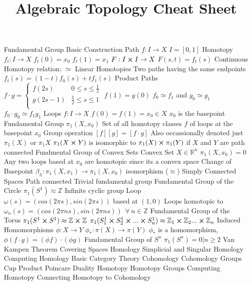 \documentclass[14pt]{extarticle}
\title{Algebraic Topology Cheat Sheet}
\begin{document}
	\maketitle
	

	\begin{outline}		
		\1	Fundamental Group
			\2	Basic Construction	
				\3	Path
					\4	$f : I \rightarrow X$
					\4	$I = [0,1]$
				\3	Homotopy
					\4	$f_t : I \rightarrow X$
					\4	$f_t(0) = x_0$
					\4	$f_t(1) = x_1$
					\4	$F: I \cross I \rightarrow X$
					\4	$F(s,t) = f_t(s)$ Continuous
					\4	Homotopy relation: $\simeq$
				\3	Linear Homotopies
					\4	Two paths having the same endpoints
					\4	$f_t(s) = (1-t)f_0(s) + tf_1(s)$
				\3	Product Paths
					\4	$f \cdot g = \begin{cases}
														f(2s) & 0 \le s \le \frac{1}{2}	\\
														g(2s-1) & \frac{1}{2} \le s \le 1 \\
														\end{cases}
													$
					\4	$f(1) = g(0)$
					\4	$f_0 \simeq f_1$ and $g_0 \simeq g_1$
					\4	$f_0 \cdot g_0 \simeq f_1 g_1$
				\3	Loops
					\4	$f : I \rightarrow X$
					\4	$f(0) = f(1) = x_0 \in X$
					\4	$x_0$ is the basepoint
				\3	Fundamental Group $\pi_1(X,x_0)$
					\4	Set of all homotopy classes $f$ of loops at the basepoint $x_0$
					\4	Group operation $[f][g] = [f \cdot g]$
					\4	Also occassionally denoted just $\pi_1(X)$ or $\pi_1X$
					\4	$\pi_1(X \cross Y)$ is isomorphic to $\pi_1(X) \cross \pi_1(Y)$ 
							if $X$ and $Y$ are path connected
				\3	Fundmental Group of Convex Sets
					\4	Convex Set $X \in \mathbb{R}^n$
					\4	$\pi_1(X,x_0) = 0$
					\4	Any two loops based at $x_0$ are homotopic since its a convex space
				\3	Change of Basepoint
					\4	$\beta_h : \pi_1(X,x_1) \rightarrow \pi_1(X,x_0)$
					\4	isomorphism ($\approx$)
				\3	Simply Connected Spaces
					\4	Path connected
					\4	Trivial fundamental group
				\3	Fundamental Group of the Circle
					\4	$\pi_1(S^1) \approx \mathbb{Z}$
					\4	Infinite cyclic group 
					\4	Loop $\omega(s) = (cos(2\pi s), sin(2 \pi s))$ based at $(1,0)$
					\4	Loops homotopic to $\omega_n(s) = (cos(2\pi n s),sin(2\pi n s))~~\forall~n \in \mathbb{Z}$
				\3	Fundamental Group of the Torus
					\4	$\pi_1(S^1 \cross S^1) \approx \mathbb{Z} \cross \mathbb{Z}$
					\4	$\pi_1(S_1^1 \cross S_2^1 \cross ... \cross S_n^1) \approx 
								\mathbb{Z}_1 \cross \mathbb{Z}_2 ... \cross \mathbb{Z}_n$
				\3	Induced Homomorphisms
					\4	$\phi : X \rightarrow Y$
					\4	$\phi_* : \pi(X) \rightarrow \pi(Y)$
					\4	$\phi_*$ is a homomorphism, $\phi(f \cdot g) = (\phi f) \cdot (\phi g)$
				\3	Fundamental Group of $S^n$
					\4	$\pi_1(S^n) = 0 | n \ge 2$
			\2	Van Kampen Theorem
			\2	Covering Spaces
		\1	Homology
			\2	Simplicial and Singular Homology
			\2	Computing Homology
			\2	Basic Category Theory
		\1	Cohomology
			\2	Cohomology Groups
			\2	Cup Product
			\2	Poincare Duality
		\1	Homotopy
			\2	Homotopy Groups
			\2	Computing Homotopy
			\2	Connecting Homotopy to Cohomology
		
	\end{outline}
\end{document}
